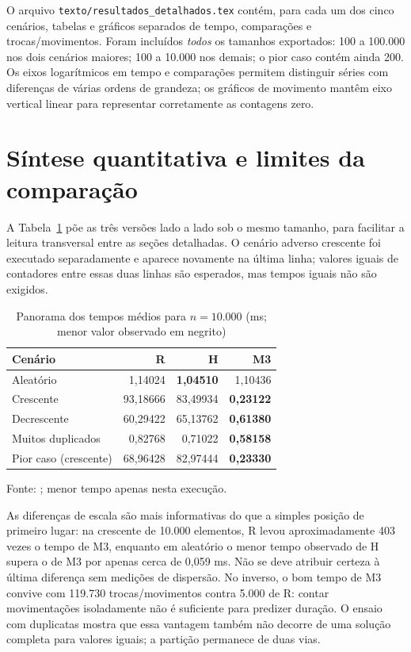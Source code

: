 O arquivo \texttt{texto/resultados\_detalhados.tex} contém, para cada um dos cinco cenários, tabelas e gráficos separados de tempo, comparações e trocas/movimentos. Foram incluídos \emph{todos} os tamanhos exportados: 100 a 100.000 nos dois cenários maiores; 100 a 10.000 nos demais; o pior caso contém ainda 200. Os eixos logarítmicos em tempo e comparações permitem distinguir séries com diferenças de várias ordens de grandeza; os gráficos de movimento mantêm eixo vertical linear para representar corretamente as contagens zero.



\section{Síntese quantitativa e limites da comparação}

A Tabela~\ref{tab:panorama10000} põe as três versões lado a lado sob o mesmo tamanho, para facilitar a leitura transversal entre as seções detalhadas. O cenário adverso crescente foi executado separadamente e aparece novamente na última linha; valores iguais de contadores entre essas duas linhas são esperados, mas tempos iguais não são exigidos.

\begin{table}[htbp]
\centering
\caption{Panorama dos tempos médios para $n=10.000$ (ms; menor valor observado em negrito)}
\label{tab:panorama10000}
\begin{tabular}{l r r r}
\hline
Cenário & R & H & M3 \\
\hline
Aleatório & 1,14024 & \textbf{1,04510} & 1,10436 \\
Crescente & 93,18666 & 83,49934 & \textbf{0,23122} \\
Decrescente & 60,29422 & 65,13762 & \textbf{0,61380} \\
Muitos duplicados & 0,82768 & 0,71022 & \textbf{0,58158} \\
Pior caso (crescente) & 68,96428 & 82,97444 & \textbf{0,23330} \\
\hline
\end{tabular}
\par\smallskip\footnotesize Fonte: ; menor tempo apenas nesta execução.\normalsize
\end{table}

As diferenças de escala são mais informativas do que a simples posição de primeiro lugar: na crescente de 10.000 elementos, R levou aproximadamente 403 vezes o tempo de M3, enquanto em aleatório o menor tempo observado de H supera o de M3 por apenas cerca de 0,059 ms. Não se deve atribuir certeza à última diferença sem medições de dispersão. No inverso, o bom tempo de M3 convive com 119.730 trocas/movimentos contra 5.000 de R: contar movimentações isoladamente não é suficiente para predizer duração. O ensaio com duplicatas mostra que essa vantagem também não decorre de uma solução completa para valores iguais; a partição permanece de duas vias.

